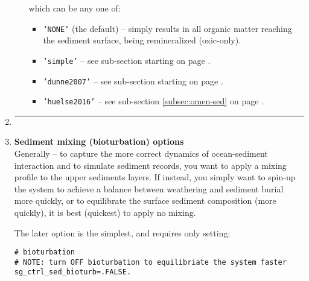 \begin{enumerate}[noitemsep]
\begin{itemize}[noitemsep]
\begin{verbatim}
\end{verbatim}\normalsize\vspace{-0mm}
which can be any one of:
\begin{itemize}[noitemsep]
\item \texttt{'NONE'} (the default) -- simply results in all organic matter reaching the sediment surface, being remineralized (oxic-only).
\item \texttt{'simple'} -- see sub-section starting on page \pageref{subsec:include_organic_carbon_burial}.
\item \texttt{'dunne2007'} -- see sub-section starting on page \pageref{subsec:include_organic_carbon_burial}.
\item \texttt{'huelse2016'} -- see sub-section \ref{subsec:omen-sed} on page \pageref{subsec:omen-sed}.
\end{itemize}

\end{itemize}

\item []\noindent\rule{4cm}{0.5pt}
\vspace{1mm}

\newpage
%
\vspace{2mm}
\item \textbf{Sediment mixing (bioturbation) options}
\vspace{1mm}
\\Generally -- to capture the more correct dynamics of ocean-sediment interaction and to simulate sediment records, you want to apply a mixing profile to the upper sediments layers. If instead, you simply want to spin-up the system to achieve a balance between weathering and sediment burial more quickly, or to equilibrate the surface sediment composition (more quickly), it is best (quickest) to apply no mixing.

\vspace{1mm}
The later option is the simplest, and requires only setting:
\vspace{-1mm}\small\begin{verbatim}
# bioturbation
# NOTE: turn OFF bioturbation to equilibriate the system faster
sg_ctrl_sed_bioturb=.FALSE.
\end{verbatim}\normalsize\vspace{-1mm}


\end{enumerate}
